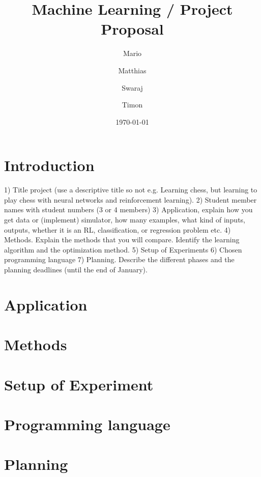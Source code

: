 \documentclass[dvips,12pt]{article}
\title{Machine Learning / Project Proposal}
\author{Mario \and Matthias \and Swaraj \and Timon}
\date{\today}
\begin{document}
\maketitle

\section{Introduction}
1) Title project (use a descriptive title so not e.g. Learning chess, but learning to play chess with neural networks and reinforcement learning).
2) Student member names with student numbers (3 or 4 members)
3) Application, explain how you get data or (implement) simulator, how many examples, what kind
of inputs, outputs, whether it is an RL, classification, or regression problem etc.
4) Methods. Explain the methods that you will compare. Identify the learning
algorithm and the optimization method.
5) Setup of Experiments
6) Chosen programming language
7) Planning. Describe the different phases and the planning deadlines (until the end of January).

\section{Application}
\section{Methods}
\section{Setup of Experiment}
\section{Programming language}
\section{Planning}
\begin{thebibliography}{99}

\end{thebibliography}
\end{document}
